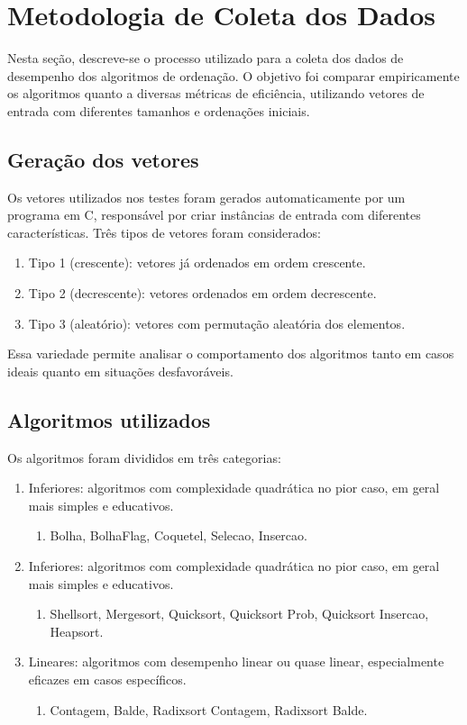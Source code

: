 \section{Metodologia de Coleta dos Dados}
Nesta seção, descreve-se o processo utilizado para a coleta dos dados de desempenho dos algoritmos de ordenação. O objetivo foi comparar empiricamente os algoritmos quanto a diversas métricas de eficiência, utilizando vetores de entrada com diferentes tamanhos e ordenações iniciais.

\subsection{Geração dos vetores}
Os vetores utilizados nos testes foram gerados automaticamente por um programa em C, responsável por criar instâncias de entrada com diferentes características. Três tipos de vetores foram considerados:

\begin{enumerate}
    \item Tipo 1 (crescente): vetores já ordenados em ordem crescente.
    \item Tipo 2 (decrescente): vetores ordenados em ordem decrescente.
    \item Tipo 3 (aleatório): vetores com permutação aleatória dos elementos.
\end{enumerate}

Essa variedade permite analisar o comportamento dos algoritmos tanto em casos ideais quanto em situações desfavoráveis.

\subsection{Algoritmos utilizados}
Os algoritmos foram divididos em três categorias:

\begin{enumerate}
    \item Inferiores: algoritmos com complexidade quadrática no pior caso, em geral mais simples e educativos.
    \begin{enumerate}
        \item Bolha, BolhaFlag, Coquetel, Selecao, Insercao.
    \end{enumerate}
    \item Inferiores: algoritmos com complexidade quadrática no pior caso, em geral mais simples e educativos.
    \begin{enumerate}
        \item Shellsort, Mergesort, Quicksort, Quicksort Prob, Quicksort Insercao, Heapsort.
    \end{enumerate}
    \item Lineares: algoritmos com desempenho linear ou quase linear, especialmente eficazes em casos específicos.
    \begin{enumerate}
        \item Contagem, Balde, Radixsort Contagem, Radixsort Balde.
    \end{enumerate}
\end{enumerate}

